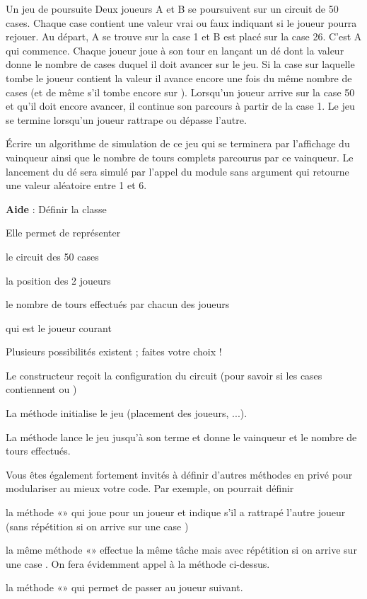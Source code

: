 \begin{Exercice}{Un jeu de poursuite}
	Deux joueurs A et B se poursuivent sur un
	circuit de 50 cases. Chaque case contient une valeur vrai ou faux
	indiquant si le joueur pourra rejouer.
	Au départ, A se trouve sur la case 1 et B est placé sur la case 26.
	C’est A qui commence. Chaque joueur joue à son tour en lançant un dé
	dont la valeur donne le nombre de cases duquel il doit avancer sur le
	jeu. Si la case sur laquelle tombe le joueur contient la valeur
	 il avance encore
	une fois du même nombre de cases (et de même s’il tombe encore sur
	). Lorsqu’un joueur
	arrive sur la case 50 et qu’il doit encore avancer, il continue son
	parcours à partir de la case 1. Le jeu se termine lorsqu’un joueur
	rattrape ou dépasse l’autre.

	Écrire un algorithme de simulation de ce jeu
	qui se terminera par l’affichage du vainqueur ainsi que le nombre de
	tours complets parcourus par ce vainqueur. 
	Le lancement du dé sera simulé par l’appel du module sans argument
	 qui retourne
	une valeur aléatoire entre 1 et 6.

	\textbf{Aide} :	Définir la classe
	
	Elle permet de représenter
	\begin{liste}
		\item 
			le circuit des 50 cases
		\item 
			la position des 2 joueurs
		\item 
			le nombre de tours effectués par chacun des joueurs
		\item 
			qui est le joueur courant
	\end{liste}
	Plusieurs possibilités existent ; faites votre choix !
	\begin{liste}
		\item 
			Le constructeur reçoit la configuration du circuit (pour savoir si les
			cases contiennent  ou
			)
		\item 
			La méthode  initialise le jeu
			(placement des joueurs, ...).
		\item 
			La méthode  lance le jeu jusqu’à son terme et
			donne le vainqueur et le nombre de tours effectués.
		\item 
			Vous êtes également fortement invités à définir d’autres méthodes en
			privé pour modulariser au mieux votre code. Par exemple, on pourrait
			définir
		\item 
			la méthode «» qui joue pour un joueur et
			indique s'il a rattrapé l’autre joueur (sans
			répétition si on arrive sur une case )
		\item 
			la même méthode «» effectue la même tâche
			mais avec répétition si on arrive sur une case
			. On fera évidemment appel à la méthode
			ci-dessus.
		\item 
			la méthode «» qui permet de passer au
			joueur suivant.
	\end{liste}
	

\end{Exercice}

